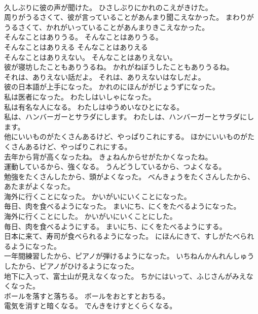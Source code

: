 \documentclass[8pt]{extreport}
\begin{document}
\begin{CJK}{UTF8}{min}
\\	久しぶりに彼の声が聞けた。	ひさしぶりにかれのこえがきけた。 
\\	周りがうるさくて、彼が言っていることがあんまり聞こえなかった。	まわりがうるさくて、かれがいっていることがあんまりきこえなかった。 
\\	そんなことはありうる。	そんなことはありうる。 
\\	そんなことはありえる	そんなことはありえる 
\\	そんなことはありえない。	そんなことはありえない。 
\\	彼が寝坊したこともありうるね。	かれがねぼうしたこともありうるね。 
\\	それは、ありえない話だよ。	それは、ありえないはなしだよ。 
\\	彼の日本語が上手になった。	かれのにほんががじょうずになった。 
\\	私は医者になった。	わたしはいしゃになった。 
\\	私は有名な人になる。	わたしはゆうめいなひとになる。 
\\	私は、ハンバーガーとサラダにします。	わたしは、ハンバーガーとサラダにします。 
\\	他にいいものがたくさんあるけど、やっぱりこれにする。	ほかにいいものがたくさんあるけど、やっぱりこれにする。 
\\	去年から背が高くなったね。	きょねんからせがたかくなったね。 
\\	運動しているから、強くなる。	うんどうしているから、つよくなる。 
\\	勉強をたくさんしたから、頭がよくなった。	べんきょうをたくさんしたから、あたまがよくなった。 
\\	海外に行くことになった。	かいがいにいくことになった。 
\\	毎日、肉を食べるようになった。	まいにち、にくをたべるようになった。 
\\	海外に行くことにした。	かいがいにいくことにした。 
\\	毎日、肉を食べるようにする。	まいにち、にくをたべるようにする。 
\\	日本に来て、寿司が食べられるようになった。	にほんにきて、すしがたべられるようになった。 
\\	一年間練習したから、ピアノが弾けるようになった。	いちねんかんれんしゅうしたから、ピアノがひけるようになった。 
\\	地下に入って、富士山が見えなくなった。	ちかにはいって、ふじさんがみえなくなった。 
\\	ボールを落すと落ちる。	ボールをおとすとおちる。 
\\	電気を消すと暗くなる。	でんきをけすとくらくなる。 

\end{CJK}
\end{document}
